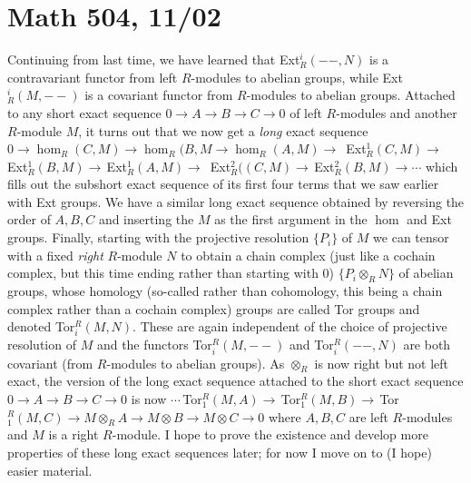 \documentclass[10pt]{article}
\begin{document}
\section*{Math 504, 11/02}

Continuing from last time, we have learned that Ext$_R^i(--,N)$ is a
contravariant functor from left $R$-modules to abelian groups, while
Ext$_R^i(M,--)$ is a covariant functor from $R$-modules to abelian
groups. Attached to any short exact sequence $0\rightarrow A\rightarrow
B\rightarrow C\rightarrow 0$ of left $R$-modules and another $R$-module
$M$, it turns out that we now get a {\sl long} exact sequence
$0\rightarrow
\hom_R(C,M)\rightarrow\hom_R(B,M\rightarrow\hom_R(A,M)\rightarrow\,$
Ext$_R^1(C,M)\rightarrow\,$Ext$_R^1(B,M)\rightarrow\,$Ext$_R^1(A,M)\rightarrow\,$
Ext$_R^2((C,M)\rightarrow\,$Ext$_R^2(B,M)\rightarrow\cdots$ which fills
out the subshort exact sequence of its first four terms that we saw
earlier with Ext groups. We have a similar long exact sequence obtained
by reversing the order of $A,B,C$ and inserting the $M$ as the first
argument in the $\hom$ and Ext groups. Finally, starting with the
projective resolution $\{P_i\}$ of $M$ we can tensor with a fixed {\sl
  right} $R$-module $N$ to obtain a chain complex (just like a cochain
complex, but this time ending rather than starting with 0)
$\{P_i\otimes_R N\}$ of abelian groups, whose homology (so-called rather
than cohomology, this being a chain complex rather than a cochain
complex) groups are called Tor groups and denoted Tor$^R_i(M,N)$. These
are again independent of the choice of projective resolution of $M$ and
the functors Tor$^R_i(M,--)$ and Tor$^R_i(--,N)$ are both covariant
(from $R$-modules to abelian groups). As $\otimes_R$ is now right but
not left exact, the version of the long exact sequence attached to the
short exact sequence $0\rightarrow A\rightarrow B\rightarrow
C\rightarrow 0$ is now
$\cdots\,$Tor$^R_1(M,A)\rightarrow\,$Tor$^R_1(M,B)\rightarrow\,$Tor$^R_1(M,C)\rightarrow
M\otimes_R A\rightarrow M\otimes B\rightarrow M\otimes C\rightarrow 0$
where $A,B,C$ are left $R$-modules and $M$ is a right $R$-module. I hope
to prove the existence and develop more properties of these long exact
sequences later; for now I move on to (I hope) easier material.
\end{document}

